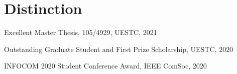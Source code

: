\vspace{-8pt}
\section*{Distinction}
\vspace{-4pt}
\indent


Excellent Master Thesis, 105/4929, UESTC, 2021

Outstanding Graduate Student and First Prize Scholarship, UESTC, 2020

INFOCOM 2020 Student Conference Award, IEEE ComSoc, 2020
